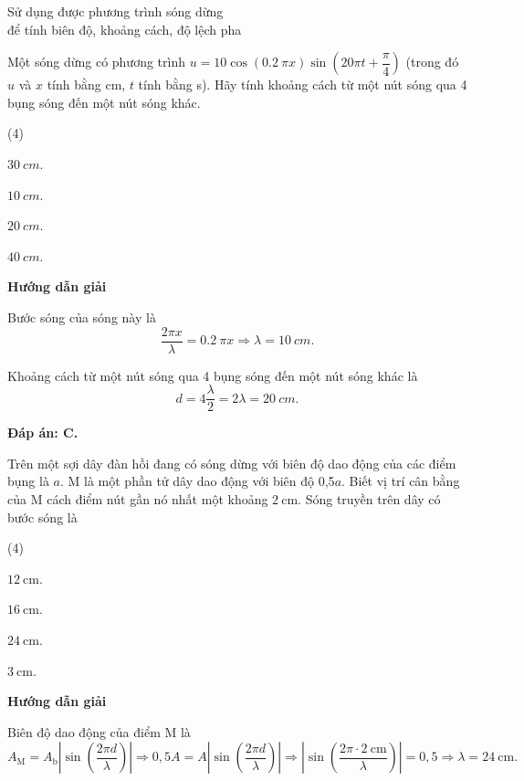 \begin{dang}{Sử dụng được phương trình sóng dừng\\ để tính biên độ, khoảng cách, độ lệch pha}
	{Một sóng dừng có phương trình $u=10\cos(\SI{0.2}{}\pi x)\sin\left(20\pi t+\dfrac{\pi}{4}\right)$ (trong đó $u$ và $x$ tính bằng cm, $t$ tính bằng s). Hãy tính khoảng cách từ một nút sóng qua 4 bụng sóng đến một nút sóng khác.
		\begin{mcq}(4)
			\item $\SI{30}{cm}$.
			\item $\SI{10}{cm}$.
			\item $\SI{20}{cm}$.
			\item $\SI{40}{cm}$.
		\end{mcq}
	}
	{
		\begin{center}
			\textbf{Hướng dẫn giải}
		\end{center}
		
		Bước sóng của sóng này là
		$$\dfrac{2\pi x}{\lambda}=\SI{0.2}{}\pi x\Rightarrow \lambda=\SI{10}{cm}.$$
		
		Khoảng cách từ một nút sóng qua 4 bụng sóng đến một nút sóng khác là
		$$d=4\dfrac{\lambda}{2}=2\lambda=\SI{20}{cm}.$$
		
		\textbf{Đáp án: C.}
	}
	{	Trên một sợi dây đàn hồi đang có sóng dừng với biên độ dao động của các điểm bụng là $a$. M là một phần tử dây dao động với biên độ 0,5$a$. Biết vị trí cân bằng của M cách điểm nút gần nó nhất một khoảng $\SI{2}{\centi\meter}$. Sóng truyền trên dây có bước sóng là
		\begin{mcq} (4)
			\item $\SI{12}{\centi\meter}$.
			\item $\SI{16}{\centi\meter}$.
			\item $\SI{24}{\centi\meter}$.
			\item $\SI{3}{\centi\meter}$.
		\end{mcq}
	}
	{
		\begin{center}
			\textbf{Hướng dẫn giải}
		\end{center}
		
		Biên độ dao động của điểm M là
		\begin{equation*}
			A_\text{M}= A_\text{b}\left|\sin\left( \dfrac{2\pi d}{\lambda}\right)\right|
			\Rightarrow 0,5A=A\left|\sin\left( \dfrac{2\pi d}{\lambda}\right)\right|
			\Rightarrow \left|\sin\left( \dfrac{2\pi \cdot \SI{2}{\centi\meter}}{\lambda}\right)\right|=0,5
			\Rightarrow \lambda=\SI{24}{\centi\meter}.
		\end{equation*}
		
}
\end{dang}
